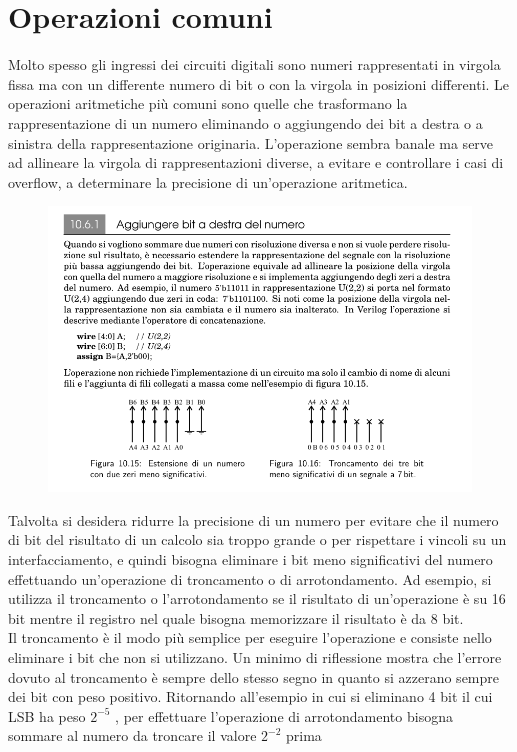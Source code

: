 \documentclass{book}
\begin{document}
    \section{Operazioni comuni}
        Molto spesso gli ingressi dei circuiti digitali sono numeri rappresentati in virgola ﬁssa ma con un differente numero di bit o con la virgola in posizioni differenti. Le operazioni aritmetiche più comuni sono quelle che trasformano la rappresentazione di un numero eliminando o aggiungendo dei bit a destra o a sinistra della rappresentazione originaria. L’operazione sembra banale ma serve ad allineare la virgola di rappresentazioni diverse, a evitare e controllare i casi di overﬂow, a determinare la precisione di un’operazione aritmetica.
        \begin{figure}[h!]
            \centering
            \includegraphics[width=0.65\linewidth]{img/chapt10img6.png}
        \end{figure} \newpage
        Talvolta si desidera ridurre la precisione di un numero per evitare che il numero di bit del
        risultato di un calcolo sia troppo grande o per rispettare i vincoli su un interfacciamento,
        e quindi bisogna eliminare i bit meno signiﬁcativi del numero effettuando un’operazione di
        troncamento o di arrotondamento. Ad esempio, si utilizza il troncamento o l’arrotondamento
        se il risultato di un’operazione è su 16 bit mentre il registro nel quale bisogna memorizzare il risultato è da 8 bit.\\
        Il troncamento è il modo più semplice per eseguire l’operazione e consiste nello eliminare i
        bit che non si utilizzano. Un minimo di riﬂessione mostra che l’errore dovuto al troncamento è
        sempre dello stesso segno in quanto si azzerano sempre dei bit con peso positivo.
        Ritornando all’esempio in cui si eliminano 4 bit il cui LSB ha peso $2^{-5}$ , per effettuare
        l’operazione di arrotondamento bisogna sommare al numero da troncare il valore $2^{-2}$ prima
\end{document}

